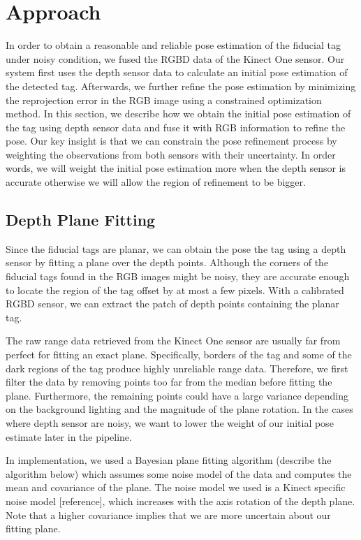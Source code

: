 \section{Approach}
\label{sec:approach}
In order to obtain a reasonable and reliable pose estimation of the fiducial tag under noisy condition, we fused the RGBD data of the Kinect One sensor. Our system first uses the depth sensor data to calculate an initial pose estimation of the detected tag. Afterwards, we further refine the pose estimation by minimizing the reprojection error in the RGB image using a constrained optimization method. In this section, we describe how we obtain the initial pose estimation of the tag using depth sensor data and fuse it with RGB information to refine the pose. Our key insight is that we can constrain the pose refinement process by weighting the observations from both sensors with their uncertainty. In order words, we will weight the initial pose estimation more when the depth sensor is accurate otherwise we will allow the region of refinement to be bigger. 

\subsection{Depth Plane Fitting}
Since the fiducial tags are planar, we can obtain the pose the tag using a depth sensor by fitting a plane over the depth points. Although the corners of the fiducial tags found in the RGB images might be noisy, they are accurate enough to locate the region of the tag offset by at most a few pixels. With a calibrated RGBD sensor, we can extract the patch of depth points containing the planar tag. 

The raw range data retrieved from the Kinect One sensor are usually far from perfect for fitting an exact plane. Specifically, borders of the tag and some of the dark regions of the tag produce highly unreliable range data. Therefore, we first filter the data by removing points too far from the median before fitting the plane. Furthermore, the remaining points could have a large variance depending on the background lighting and the magnitude of the plane rotation. In the cases where depth sensor are noisy, we want to lower the weight of our initial pose estimate later in the pipeline. 

In implementation, we used a Bayesian plane fitting algorithm (describe the algorithm below) which assumes some noise model of the data and computes the mean and covariance of the plane. The noise model we used is a Kinect specific noise model [reference], which increases with the axis rotation of the depth plane. Note that a higher covariance implies that we are more uncertain about our fitting plane.

